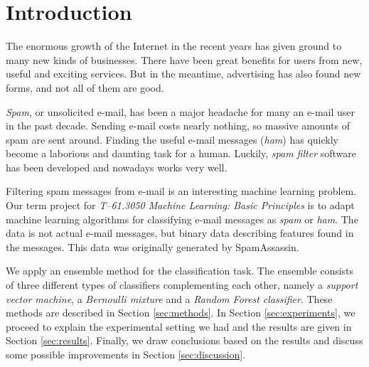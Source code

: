 \section{Introduction}

The enormous growth of the Internet in the recent years has given ground
to many new kinds of businesses. There have been great benefits for
users from new, useful and exciting services. But in the meantime,
advertising has also found new forms, and not all of them are good.

\emph{Spam}, or unsolicited e-mail, has been a major headache for many
an e-mail user in the past decade. Sending e-mail costs nearly nothing,
so massive amounts of spam are sent around. Finding the useful e-mail
messages (\emph{ham}) has quickly become a laborious and daunting task
for a human. Luckily, \emph{spam filter} software has been developed and
nowadays works very well.

Filtering spam messages from e-mail is an interesting machine learning
problem. Our term project for \emph{T--61.3050 Machine Learning: Basic
Principles} is to adapt machine learning algorithms for classifying
e-mail messages as \emph{spam} or \emph{ham}. The data is not actual
e-mail messages, but binary data describing features found in the
messages. This data was originally generated by SpamAssassin.

We apply an ensemble method for the classification task. The ensemble
consists of three different types of classifiers complementing each
other, namely a \emph{support vector machine}, a \emph{Bernoulli
mixture} and a \emph{Random Forest classifier}. These methods are
described in Section \ref{sec:methods}. In Section
\ref{sec:experiments}, we proceed to explain the experimental setting we
had and the results are given in Section \ref{sec:results}. Finally, we
draw conclusions based on the results and discuss some possible
improvements in Section \ref{sec:discussion}.
